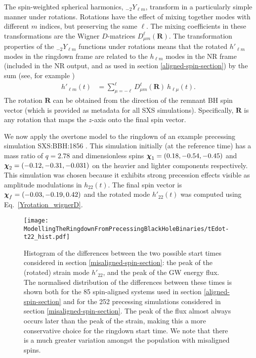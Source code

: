 The spin-weighted spherical harmonics, ${}_{-2}Y_{\ell m}$, transform in a particularly simple manner under rotations.
Rotations have the effect of mixing together modes with different $m$ indices, but preserving the same $\ell$. 
The mixing coefficients in these transformations are the Wigner $D$-matrices $D^{\ell}_{\mu m} (\mathbf{R})$.
The transformation properties of the ${}_{-2}Y_{\ell m}$ functions under rotations means that the rotated $h'_{\ell m}$ modes in the ringdown frame are related to the $h_{\ell m}$ modes in the NR frame (included in the NR output, and as used in section \ref{aligned-spin-section}) by the sum (see, for example \cite{Boyle:2013nka, Schmidt:2010it, OShaughnessy:2011pmr})
\begin{align}\label{Yrotation_wignerD}
    h'_{\ell m}(t) &= \sum_{\mu = -\ell}^{\ell} D^{\ell}_{\mu m} (\mathbf{R}) ~ h_{\ell \mu}(t).
\end{align}
The rotation $\mathbf{R}$ can be obtained from the direction of the remnant BH spin vector (which is provided as metadata for all SXS simulations). Specifically, $\mathbf{R}$ is any rotation that maps the $z$-axis onto the final spin vector.

We now apply the overtone model to the ringdown of an example precessing simulation SXS:BBH:1856 \cite{Varma:2019csw}. 
This simulation initially (at the reference time) has a mass ratio of $q=2.78$ and dimensionless spins $\vb*{\chi}_1=(0.18, -0.54, -0.45)$ and $\vb*{\chi}_2=(-0.12, -0.31, -0.031)$ on the heavier and lighter components respectively. This simulation was chosen because it exhibits strong precession effects visible as amplitude modulations in $h_{22}(t)$. The final spin vector is $\vb*{\chi}_f=(-0.03,-0.19,0.42)$ and the rotated mode $h'_{22}(t)$ was computed using Eq.~\ref{Yrotation_wignerD}.

\begin{figure}[t]
    \centering
    \texttt{[image: ModellingTheRingdownFromPrecessingBlackHoleBinaries/tEdot-t22\_hist.pdf]}
    \caption[Differences between the times of peak strain and peak GW energy flux]{  
    Histogram of the differences between the two possible start times considered in section \ref{misaligned-spin-section}: the peak of the (rotated) strain mode $h'_{22}$, and the peak of the GW energy flux.
    The normalised distribution of the differences between these times is shown both for the 85 spin-aligned systems used in section \ref{aligned-spin-section} and for the 252 precessing simulations considered in section \ref{misaligned-spin-section}. 
    The peak of the flux almost always occurs later than the peak of the strain, making this a more conservative choice for the ringdown start time. 
    We note that there is a much greater variation amongst the population with misaligned spins.
    }
    \label{tEdot-t22}
\end{figure}

